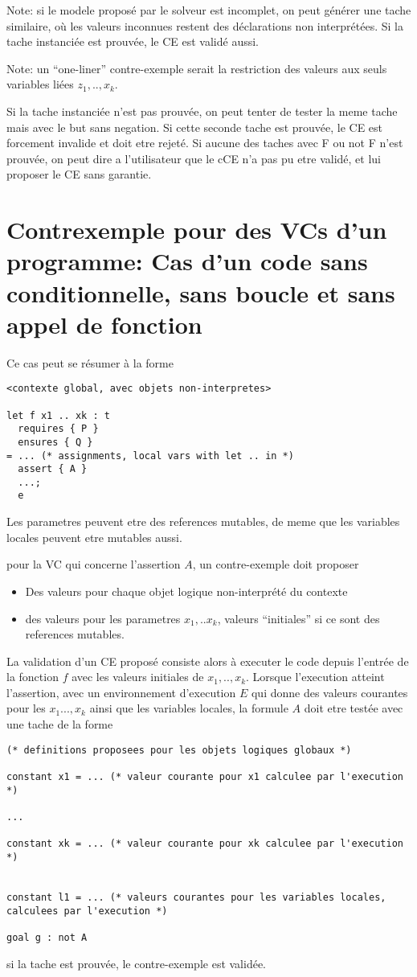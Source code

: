 \documentclass[a4paper,twoside]{article}
\begin{document}
Note: si le modele proposé par le solveur est incomplet, on peut générer une
tache similaire, où les valeurs inconnues restent des déclarations non
interprétées. Si la tache instanciée est prouvée, le CE est validé aussi.

Note: un ``one-liner'' contre-exemple serait la restriction des valeurs aux
seuls variables liées $z_1,..,x_k$.

Si la tache instanciée n'est pas prouvée, on peut tenter de tester la meme tache
mais avec le but sans negation. Si cette seconde tache est prouvée, le CE est
forcement invalide et doit etre rejeté. Si aucune des taches avec F ou not F
n'est prouvée, on peut dire a l'utilisateur que le cCE n'a pas pu etre validé,
et lui proposer le CE sans garantie.


\section{Contrexemple pour des VCs d'un programme: Cas d'un code sans conditionnelle, sans boucle et sans appel de fonction}

Ce cas peut se résumer à la forme

\begin{lstlisting}
<contexte global, avec objets non-interpretes>

let f x1 .. xk : t
  requires { P }
  ensures { Q }
= ... (* assignments, local vars with let .. in *)
  assert { A }
  ...;
  e
\end{lstlisting}
Les parametres peuvent etre des references mutables, de meme que les variables
locales peuvent etre mutables aussi.

pour la VC qui concerne l'assertion $A$, un contre-exemple doit proposer
\begin{itemize}
\item Des valeurs pour chaque objet logique non-interprété du contexte
\item des valeurs pour les parametres $x_1,..x_k$, valeurs ``initiales'' si ce
  sont des references mutables.
\end{itemize}

La validation d'un CE proposé consiste alors à executer le code depuis l'entrée
de la fonction $f$ avec les valeurs initiales de $x_1,..,x_k$. Lorsque l'execution atteint l'assertion, avec un environnement d'execution $E$ qui donne des valeurs courantes pour les $x_1...,x_k$ ainsi que les variables locales, la formule $A$ doit etre testée avec une tache de la forme
\begin{lstlisting}
(* definitions proposees pour les objets logiques globaux *)

constant x1 = ... (* valeur courante pour x1 calculee par l'execution *)

...

constant xk = ... (* valeur courante pour xk calculee par l'execution *)


constant l1 = ... (* valeurs courantes pour les variables locales, calculees par l'execution *)

goal g : not A
\end{lstlisting}
si la tache est prouvée, le contre-exemple est validée.
\end{document}

